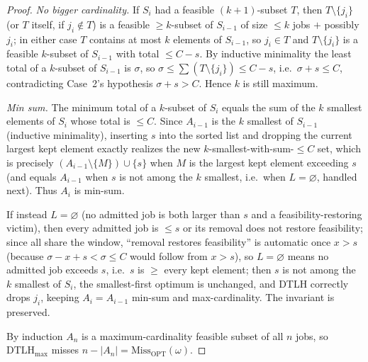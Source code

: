 \documentclass{amsart}
\theoremstyle{definition}
\begin{document}
\begin{proof}
\emph{No bigger cardinality.} If $S_i$ had a feasible $(k+1)$-subset $T$, then
$T\setminus\{j_i\}$ (or $T$ itself, if $j_i\notin T$) is a feasible
$\ge k$-subset of $S_{i-1}$ of size $\le k$ jobs $+$ possibly $j_i$; in either
case $T$ contains at most $k$ elements of $S_{i-1}$, so $j_i\in T$ and
$T\setminus\{j_i\}$ is a feasible $k$-subset of $S_{i-1}$ with total
$\le C-s$. By inductive minimality the least total of a $k$-subset of $S_{i-1}$ is
$\sigma$, so $\sigma\le \sum(T\setminus\{j_i\})\le C-s$, i.e.\ $\sigma+s\le C$,
contradicting Case~2's hypothesis $\sigma+s>C$. Hence $k$ is still maximum.

\emph{Min sum.} The minimum total of a $k$-subset of $S_i$ equals the sum of the
$k$ smallest elements of $S_i$ whose total is $\le C$. Since $A_{i-1}$ is the $k$
smallest of $S_{i-1}$ (inductive minimality), inserting $s$ into the sorted list
and dropping the current largest kept element exactly realizes the new
$k$-smallest-with-sum-$\le C$ set, which is precisely $(A_{i-1}\setminus\{M\})
\cup\{s\}$ when $M$ is the largest kept element exceeding $s$ (and equals
$A_{i-1}$ when $s$ is not among the $k$ smallest, i.e.\ when $L=\varnothing$,
handled next). Thus $A_i$ is min-sum.

If instead $L=\varnothing$ (no admitted job is both larger than $s$ and a
feasibility-restoring victim), then every admitted job is $\le s$ or its removal
does not restore feasibility; since all share the window, ``removal restores
feasibility'' is automatic once $x>s$ (because $\sigma-x+s<\sigma\le C$ would
follow from $x>s$), so $L=\varnothing$ means no admitted job exceeds $s$, i.e.\
$s$ is $\ge$ every kept element; then $s$ is not among the $k$ smallest of $S_i$,
the smallest-first optimum is unchanged, and DTLH correctly drops $j_i$, keeping
$A_i=A_{i-1}$ min-sum and max-cardinality. The invariant is preserved.

By induction $A_n$ is a maximum-cardinality feasible subset of all $n$ jobs, so
$\mathrm{DTLH}_{\max}$ misses $n-|A_n|=\mathrm{Miss}_{\mathrm{OPT}}(\omega)$.
\end{proof}
\end{document}
